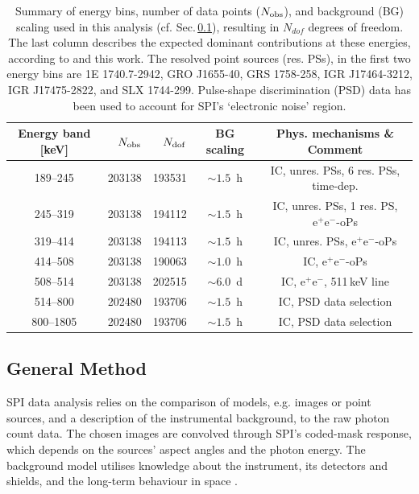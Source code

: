 \documentclass[doublespace,nopageskip]{VTthesis} %
\newcommand{\mrm}[1]{\mathrm{#1}}
\begin{document}
\begin{table}[htb]
	\centering
	\caption{Summary of energy bins, number of data points ($N_{\rm obs}$), and background (BG) scaling used in this analysis (cf. Sec.\,\ref{sec:likelihood_analysis}), resulting in $N_{dof}$ degrees of freedom. The last column describes the expected dominant contributions at these energies, according to \citet{Strong2005_gammaconti} and this work. The resolved point sources (res. PSs), in the first two energy bins are 1E 1740.7-2942, GRO J1655-40, GRS 1758-258, IGR J17464-3212, IGR J17475-2822, and SLX 1744-299. Pulse-shape discrimination (PSD) data has been used to account for SPI's `electronic noise' region.}
	\begin{tabular}{crrcc}
        \toprule
		Energy band [keV] & $N_{\rm obs}$ & $N_{\rm dof}$ & BG scaling & Phys. mechanisms \& Comment \\
		\midrule
		189--245  & 203138 & 193531 & $\sim 1.5$~h & IC, unres. PSs, 6 res. PSs, time-dep. \\
		245--319  & 203138 & 194112 & $\sim 1.5$~h & IC, unres. PSs, 1 res. PS, $\mrm{e^+e^-}$-oPs \\
		319--414  & 203138 & 194113 & $\sim 1.5$~h & IC, unres. PSs, $\mrm{e^+e^-}$-oPs \\
		414--508  & 203138 & 190063 & $\sim 1.0$~h & IC, $\mrm{e^+e^-}$-oPs \\
		508--514  & 203138 & 202515 & $\sim 6.0$~d & IC, $\mrm{e^+e^-}$, 511\,keV line\\
		514--800  & 202480 & 193706 & $\sim 1.5$~h & IC, PSD data selection \\
		800--1805 & 202480 & 193706 & $\sim 1.5$~h & IC, PSD data selection \\
        \bottomrule
	\end{tabular}
	\label{tab:data_set_energies}
\end{table}

\subsection{General Method}\label{sec:likelihood_analysis}
%
SPI data analysis relies on the comparison of models, e.g. images or point sources, and a description of the instrumental background, to the raw photon count data.
%
The chosen images are convolved through SPI's coded-mask response, which depends on the sources' aspect angles and the photon energy.
%
The background model utilises knowledge about the instrument, its detectors and shields, and the long-term behaviour in space \citep{Diehl2018_BGRDB,Siegert2019_SPIBG}.
\end{document}
